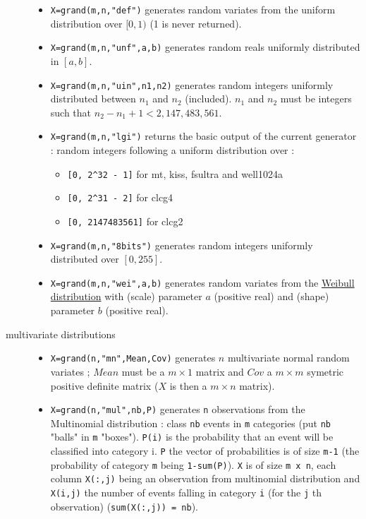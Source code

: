 \begin{description}
\begin{itemize}
\item {} \verb!X=grand(m,n,"def")! generates random variates from the uniform 
  distribution over $[0,1)$ (1 is never returned).

\item {} \verb!X=grand(m,n,"unf",a,b)! generates random reals uniformly distributed 
    in $[a, b]$.

\item {} \verb!X=grand(m,n,"uin",n1,n2)! generates random integers uniformly 
      distributed between $n_1$ and $n_2$ (included). $n_1$ and $n_2$ must be integers such that 
      $n_2-n_1+1 < 2,147,483,561$.

\item {} \verb!X=grand(m,n,"lgi")! returns the basic output of the current generator : random integers  
      following a uniform distribution over : 
      \begin{itemize}
      \item \verb![0, 2^32 - 1]! for mt, kiss, fsultra and well1024a
      \item \verb![0, 2^31 - 2]! for clcg4
      \item \verb![0, 2147483561]! for clcg2
      \end{itemize}

\item {} \verb!X=grand(m,n,"8bits")! generates random integers uniformly 
      distributed over $[0,255]$.
  
\item {} 
  \verb!X=grand(m,n,"wei",a,b)! generates random variates from the  \hyperlink{weipdf}{Weibull 
  distribution} with (scale) parameter $a$ (positive real) and (shape) parameter $b$ (positive real).
\end{itemize}

\item[multivariate distributions]
\begin{itemize}
\item {}
  \verb!X=grand(n,"mn",Mean,Cov)! generates  $n$ multivariate normal random variates ; 
  $Mean$ must be a $m \times 1$ matrix and $Cov$ a  $m \times m$ 
  symetric positive definite matrix  ($X$ is then a  $m \times n$
  matrix).

\item {} 
   \verb!X=grand(n,"mul",nb,P)! generates \verb!n! observations from the Multinomial 
  distribution :  class \verb!nb! events in \verb!m! categories (put \verb!nb!
  "balls" in \verb!m! "boxes"). \verb!P(i)! is the probability 
  that an event will be classified into category i. \verb!P! the vector of probabilities
  is of size  \verb!m-1! (the probability of category \verb!m! being \verb!1-sum(P)!).
  \verb!X! is of size \verb!m x n!, each column \verb!X(:,j)! being an observation 
  from multinomial distribution and \verb!X(i,j)! the number of events falling in category 
  \verb!i! (for the \verb!j! th observation) (\verb!sum(X(:,j)) = nb!).
  

\end{itemize}
\end{description}
